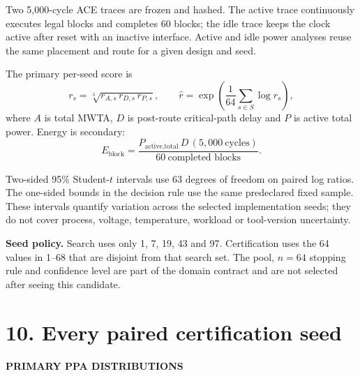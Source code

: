 \documentclass[10pt,a4paper]{article}
\newcommand{\smallcaps}[1]{\textcolor{Mid}{\fontsize{8.5}{10}\selectfont\bfseries\MakeUppercase{#1}}}
\newcommand{\newpageheading}[2]{\clearpage\section{#1}\smallcaps{#2}\vspace{6pt}}
\begin{document}
Two 5,000-cycle ACE traces are frozen and hashed. The active trace continuously executes legal blocks and completes 60 blocks; the idle trace keeps the clock active after reset with an inactive interface. Active and idle power analyses reuse the same placement and route for a given design and seed.

The primary per-seed score is
\[
r_s=\sqrt[3]{r_{A,s}\,r_{D,s}\,r_{P,s}},
\qquad
\widehat r=\exp\!\left(\frac{1}{64}\sum_{s\in S}\log r_s\right),
\]
where $A$ is total MWTA, $D$ is post-route critical-path delay and $P$ is active total power. Energy is secondary:
\[
E_{\text{block}}=
\frac{P_{\text{active,total}}\,D\,(5{,}000\ \text{cycles})}{60\ \text{completed blocks}}.
\]

Two-sided 95\% Student-$t$ intervals use 63 degrees of freedom on paired log ratios. The one-sided bounds in the decision rule use the same predeclared fixed sample. These intervals quantify variation across the selected implementation seeds; they do not cover process, voltage, temperature, workload or tool-version uncertainty.

\begin{scopebox}
\textbf{Seed policy.} Search uses only 1, 7, 19, 43 and 97. Certification uses the 64 values in 1--68 that are disjoint from that search set. The pool, $n=64$ stopping rule and confidence level are part of the domain contract and are not selected after seeing this candidate.
\end{scopebox}

\newpageheading{10. Every paired certification seed}{Primary PPA distributions}
\end{document}

